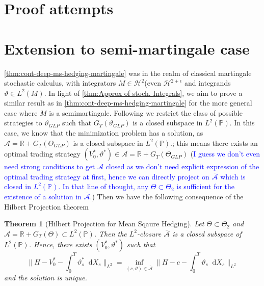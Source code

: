 \documentclass[11pt]{report}
\newcommand{\diff}{\mathop{}\!\mathrm{d}}
\theoremstyle{plain} %
\newtheorem{theorem}{Theorem}[chapter]
\theoremstyle{definition} %
\theoremstyle{remark} %
\begin{document}

\section{Proof attempts}

%
\section{Extension to semi-martingale case}
\cref{thm:cont-deep-ms-hedging-martingale} was in the realm of classical martingale stochastic calculus, with integrators \(M\in\mathcal{H}^{2}\)(even \(\mathcal{H}^{2+\epsilon}\) and integrands \(\vartheta\in L^2(M)\). In light of \cref{thm:Approx of stoch. Integrals}, we aim to prove a similar result as in \cref{thm:cont-deep-ms-hedging-martingale} for the more general case where \(M\) is a semimartingale. Following \parencite{Schweizer2001GuidedTourQuadraticHedging} we restrict the class of possible strategies to \(\vartheta_{GLP}\) such that \(G_T(\vartheta_{GLP})\) is a closed subspace in \(L^2(\mathbb{P})\). In this case, we know that the minimization problem has a solution, as \(\mathcal{A}=\mathbb{R}+G_T(\Theta_{GLP})\) is a closed subspace in \(L^2(\mathbb{P})\).; this means there exists an optimal trading strategy \((V_0^*,\vartheta^*)\in\mathcal{A}=\mathbb{R}+G_T(\Theta_{GLP})\) (\textcolor{blue}{I guess we don't even need strong conditions to get \(\mathcal{A}\) closed as we don't need explicit expression of the optimal trading strategy at first, hence we can directly project on \(\bar{\mathcal{A}}\) which is closed in \(L^2(\mathbb{P})\). In that line of thought, any \(\Theta\subset\Theta_2\) is sufficient for the existence of a solution in \(\bar{\mathcal{A}}\)}.) Then we have the following consequence of the Hilbert Projection theorem
\begin{theorem}[Hilbert Projection for Mean Sqaure Hedging]\label{thm:Hilbert Projection for Mean Sqaure Hedging}
    Let \(\Theta\subset\Theta_2\) and \(\mathcal{A}=\mathbb{R}+G_T(\Theta)\subset L^2(\mathbb{P})\). Then the \(L^2\)-closure \(\bar{\mathcal{A}}\) is a closed subspace of \(L^2(\mathbb{P})\). Hence, there exists \((V_0^*,\vartheta^*)\) such that 
    \begin{equation}
   \lVert H-V_0^*-\int_{0}^T\vartheta^*_s\diff X_s\rVert_{L^2}= \inf_{(c,\vartheta)\in\bar{\mathcal{A}}}\lVert H-c-\int_{0}^T\vartheta_s\diff X_s\rVert_{L^2}
    \end{equation}
    and the solution is unique. 
\end{theorem}
\end{document}
